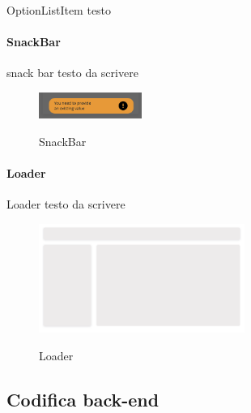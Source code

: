 OptionListItem testo

\paragraph{SnackBar}\label{par:snack-bar}

snack bar testo da scrivere

\begin{figure}[ht]
  \centering
  \includegraphics[width=0.3\textwidth, alt={Snackbar di errore}]{images/frontend/SnackBar1.jpg}
  \caption{SnackBar}\label{fig:snack-bar}
\end{figure}

\paragraph{Loader}\label{par:loader}

Loader testo da scrivere

\begin{figure}[ht]
  \centering
  \includegraphics[width=0.6\textwidth, alt={Skeleton loader di caricamento principale dell'applicazione}]{images/frontend/Loader.jpg}
  \caption{Loader}\label{fig:loader}
\end{figure}




\subsection{Codifica back-end}\label{subsec:codifica-back-end}



